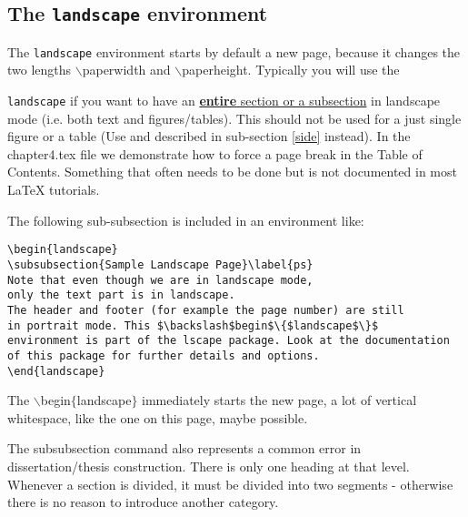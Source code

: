 
\subsection{The \texttt{landscape} environment}
The \texttt{landscape} environment starts by default a new page, because it changes the two lengths $\backslash$paperwidth and $\backslash$paperheight. Typically you will use the {\texttt{landscape} if you want to have an \underline{\textbf{entire} section or a subsection} in landscape mode (i.e. both text and figures/tables). This should not be used for a just single figure or a table (Use  and   described in sub-section \ref{side} instead). In the chapter4.tex file we demonstrate how to force a page break in the Table of Contents. Something that often needs to be done but is not documented in most LaTeX tutorials.

The following sub-subsection is included in an environment like:

\singlespacing
\begin{verbatim}
\begin{landscape}
\subsubsection{Sample Landscape Page}\label{ps}
Note that even though we are in landscape mode,
only the text part is in landscape.
The header and footer (for example the page number) are still
in portrait mode. This $\backslash$begin$\{$landscape$\}$
environment is part of the lscape package. Look at the documentation
of this package for further details and options.
\end{landscape}
\end{verbatim}
\doublespacing

The $\backslash$begin$\{$landscape$\}$ immediately starts the new page, a lot of vertical whitespace, like the one on this page, maybe possible.

The subsubsection command also represents a common error in dissertation/thesis construction. There is only one heading at that level. Whenever a section is divided, it must be divided into two segments - otherwise there is no reason to introduce another category.

\begin{landscape}

\end{landscape}}
